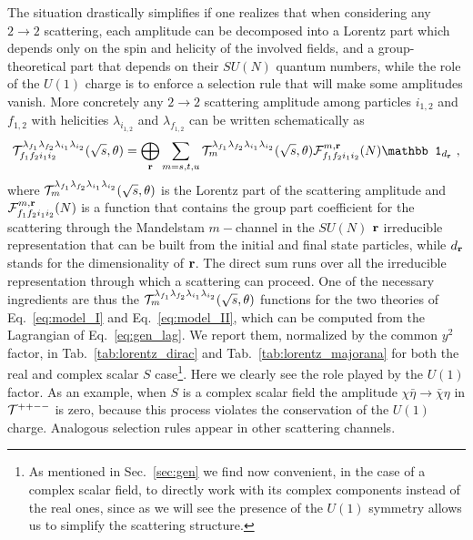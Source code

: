 \documentclass[a4paper,11pt]{article}
\newcommand{\be}{\begin{equation}}
\newcommand{\ee}{\end{equation}}
\begin{document}
The situation drastically simplifies if one realizes that when considering any $2\to 2$ scattering, each amplitude can be decomposed into a Lorentz part which depends only on the spin and helicity of the involved fields, and a group-theoretical part that depends on their
$SU(N)$ quantum numbers, while the role of the $U(1)$ charge is to enforce a selection rule that will make some amplitudes vanish.  More concretely any $2\to 2$ scattering amplitude among particles $i_{1,2}$ and $f_{1,2}$ with helicities $\lambda_{i_{1,2}}$ and $\lambda_{f_{1,2}}$ can be written schematically as
\be\label{eq:total_T}
{\cal T}_{f_1 f_2 i_1 i_2}^{\lambda_{f_1}\lambda_{f_2}\lambda_{i_1}\lambda_{i_2}} (\sqrt s, \theta)=\bigoplus_{{\bf{r}}} \sum_{m=s,t,u} {\cal T}^{\lambda_{f_1}\lambda_{f_2}\lambda_{i_1}\lambda_{i_2}}_m(\sqrt s,\theta) {\cal F}^{m, {\rm {\bf{r}}}}_{f_1 f_2 i_1 i_2} (N) {\mathbb 1}_{d_{{\bf{r}} }}\ ,
\ee
where $ {\cal T}^{\lambda_{f_1}\lambda_{f_2}\lambda_{i_1}\lambda_{i_2}}_m(\sqrt s,\theta) $ is the Lorentz part of the scattering amplitude and ${\cal F}^{m, {\rm {\bf{r}}}}_{f_1 f_2 i_1 i_2} (N)$ is a function that contains the group part coefficient for the scattering through the Mandelstam $m-$channel  in the $SU(N)$ ${\bf r}$ irreducible representation that can be built from the initial and final state particles, while $d_{\bf{r}}$ stands for the dimensionality of ${\bf r}$.
The direct sum runs over all the irreducible representation through which a scattering can proceed. One of the necessary ingredients are thus the $ {\cal T}^{\lambda_{f_1}\lambda_{f_2}\lambda_{i_1}\lambda_{i_2}}_m(\sqrt s,\theta) $ functions for the two theories of Eq.~\eqref{eq:model_I} and Eq.~\eqref{eq:model_II}, which can be computed from  the Lagrangian of Eq.~\eqref{eq:gen_lag}.  We report them, normalized by the common $y^2$ factor, in Tab.~\ref{tab:lorentz_dirac} and Tab.~\ref{tab:lorentz_majorana} for both the real and complex scalar $S$ case\footnote{As mentioned in Sec.~\ref{sec:gen} we find now convenient, in the case of a complex scalar field, to  directly work with its complex components instead of the  real ones, since as we will see the presence of the $U(1)$ symmetry allows us to simplify the scattering structure.}. Here we clearly see the role played by the $U(1)$ factor. As an example, when $S$ is a complex scalar field the amplitude $\chi \bar{\eta} \to  \bar \chi \eta$ in ${\cal T}^{++--}$ is zero, because this process violates the conservation of the $U(1)$ charge. Analogous selection rules appear in other scattering channels. 
\end{document}
